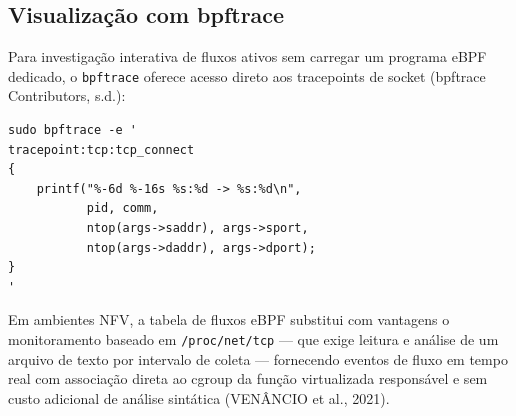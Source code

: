 \subsection*{Visualização com bpftrace}

Para investigação interativa de fluxos ativos sem carregar um programa eBPF dedicado,
o \texttt{bpftrace} oferece acesso direto aos tracepoints de socket (bpftrace Contributors,
s.d.):

\begin{lstlisting}[caption={Listagem de novas conexões TCP com origem e destino via bpftrace.}, label=lst:obs-flow-bpftrace]
sudo bpftrace -e '
tracepoint:tcp:tcp_connect
{
    printf("%-6d %-16s %s:%d -> %s:%d\n",
           pid, comm,
           ntop(args->saddr), args->sport,
           ntop(args->daddr), args->dport);
}
'
\end{lstlisting}

Em ambientes NFV, a tabela de fluxos eBPF substitui com vantagens o monitoramento
baseado em \texttt{/proc/net/tcp} — que exige leitura e análise de um arquivo de texto
por intervalo de coleta — fornecendo eventos de fluxo em tempo real com associação
direta ao cgroup da função virtualizada responsável e sem custo adicional de análise
sintática (VENÂNCIO et al., 2021).